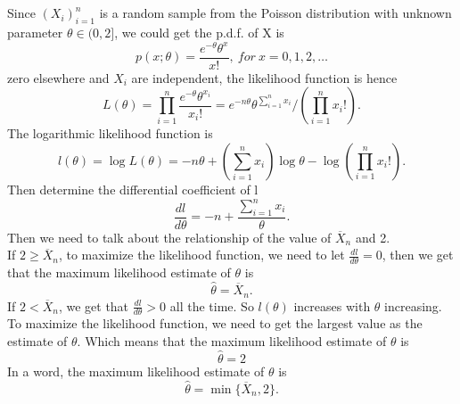 \documentclass[10.5pt]{article}
\begin{document}
\section{}
Since $(X_i)_{i=1}^n$ is a random sample from the Poisson distribution with unknown parameter $\theta \in(0,2]$, we could get the p.d.f. of X is $$p(x;\theta)=\frac{e^{-\theta}\theta^x}{x!},~for~x=0,1,2,\dots$$\indent
zero elsewhere and $X_i$ are independent, the likelihood function is hence $$L(\theta)=\prod_{i=1}^n\frac{e^{-\theta}\theta^{x_i}}{x_i!}=e^{-n\theta}\theta^{\sum_{i=1}^nx_i}/(\prod_{i=1}^nx_i!).$$\indent
The logarithmic likelihood function is $$l(\theta)=\log L(\theta)=-n\theta+(\sum_{i=1}^nx_i)\log\theta-\log(\prod_{i=1}^nx_i!).$$\indent
Then determine the differential coefficient of l $$\frac{dl}{d\theta}=-n+\frac{\sum_{i=1}^nx_i}{\theta}.$$\indent
Then we need to talk about the relationship of the value of $\overline{X}_n$ and 2.\\\indent
If $2\geqslant\overline{X}_n$, to maximize the likelihood function, we need to let $\frac{dl}{d\theta}=0$, then we get that the maximum likelihood estimate of $\theta$ is $$\hat{\theta}=\overline{X}_n.$$\indent
If $2<\overline{X}_n$, we get that $\frac{dl}{d\theta}>0$ all the time. So $l(\theta)$ increases with $\theta$ increasing. To maximize the likelihood function, we need to get the largest value as the estimate of $\theta$. Which means that the maximum likelihood estimate of $\theta$ is $$\hat{\theta}=2$$\indent
In a word, the maximum likelihood estimate of $\theta$ is $$\hat{\theta}=\min\{\overline{X}_n,2\}.$$
\end{document}
